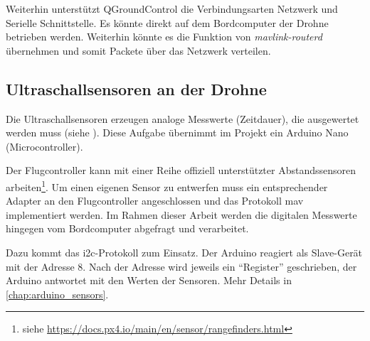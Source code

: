 Weiterhin unterstützt QGroundControl die Verbindungsarten Netzwerk und Serielle Schnittstelle. Es könnte direkt auf dem Bordcomputer der Drohne betrieben werden. Weiterhin könnte es die Funktion von \textit{mavlink-routerd} übernehmen und somit Packete über das Netzwerk verteilen.

\subsection{Ultraschallsensoren an der Drohne}
Die Ultraschallsensoren erzeugen analoge Messwerte (Zeitdauer), die ausgewertet werden muss (siehe \cite[Kapitel 4.4]{markusreinErweiterungBestehenderDrohnen2023}). Diese Aufgabe übernimmt im Projekt ein Arduino Nano (Microcontroller).\newline

Der Flugcontroller kann mit einer Reihe offiziell unterstützter Abstandssensoren arbeiten\footnote{siehe \url{https://docs.px4.io/main/en/sensor/rangefinders.html}}. Um einen eigenen Sensor zu entwerfen muss ein entsprechender Adapter an den Flugcontroller angeschlossen und das Protokoll \gls{mav} implementiert werden. Im Rahmen dieser Arbeit werden die digitalen Messwerte hingegen vom Bordcomputer abgefragt und verarbeitet.

Dazu kommt das \gls{i2c}-Protokoll zum Einsatz. Der Arduino reagiert als Slave-Gerät mit der Adresse $8$. Nach der Adresse wird jeweils ein \enquote{Register} geschrieben, der Arduino antwortet mit den Werten der Sensoren. Mehr Details in \cref{chap:arduino_sensors}.

%
%